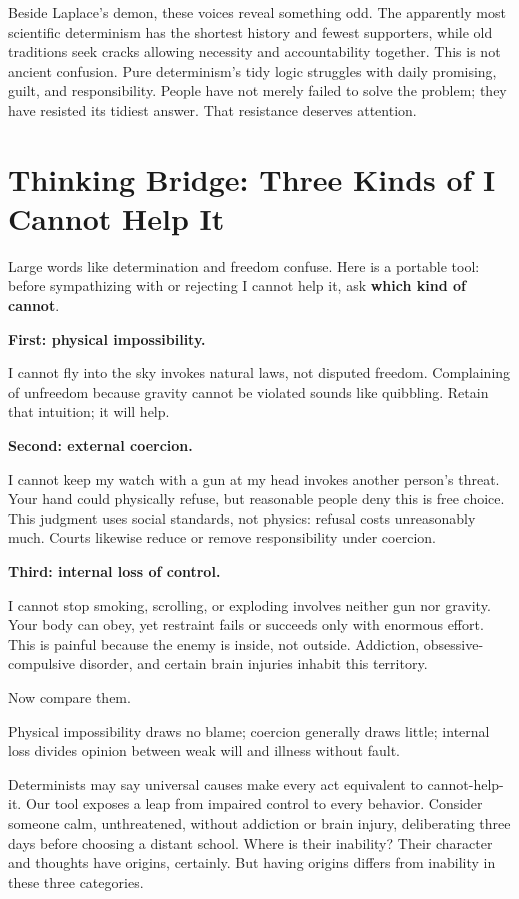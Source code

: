 Beside Laplace's demon, these voices reveal something odd. The apparently most scientific determinism has the shortest history and fewest supporters, while old traditions seek cracks allowing necessity and accountability together. This is not ancient confusion. Pure determinism's tidy logic struggles with daily promising, guilt, and responsibility. People have not merely failed to solve the problem; they have resisted its tidiest answer. That resistance deserves attention.

\section[Three Kinds of I Cannot Help It]{Thinking Bridge: Three Kinds of I Cannot Help It}
Large words like determination and freedom confuse. Here is a portable tool: before sympathizing with or rejecting I cannot help it, ask \textbf{which kind of cannot}.

\textbf{First: physical impossibility.}

I cannot fly into the sky invokes natural laws, not disputed freedom. Complaining of unfreedom because gravity cannot be violated sounds like quibbling. Retain that intuition; it will help.

\textbf{Second: external coercion.}

I cannot keep my watch with a gun at my head invokes another person's threat. Your hand could physically refuse, but reasonable people deny this is free choice. This judgment uses social standards, not physics: refusal costs unreasonably much. Courts likewise reduce or remove responsibility under coercion.

\textbf{Third: internal loss of control.}

I cannot stop smoking, scrolling, or exploding involves neither gun nor gravity. Your body can obey, yet restraint fails or succeeds only with enormous effort. This is painful because the enemy is inside, not outside. Addiction, obsessive-compulsive disorder, and certain brain injuries inhabit this territory.

Now compare them.

Physical impossibility draws no blame; coercion generally draws little; internal loss divides opinion between weak will and illness without fault.

Determinists may say universal causes make every act equivalent to cannot-help-it. Our tool exposes a leap from impaired control to every behavior. Consider someone calm, unthreatened, without addiction or brain injury, deliberating three days before choosing a distant school. Where is their inability? Their character and thoughts have origins, certainly. But having origins differs from inability in these three categories.

